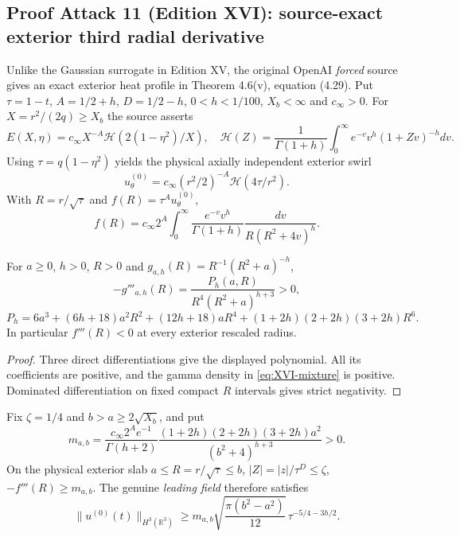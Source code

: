 \subsection*{Proof Attack 11 (Edition XVI): source-exact exterior third radial derivative}
\label{subsec:editionXVI-exterior-derivative}
Unlike the Gaussian surrogate in Edition XV, the original OpenAI
\emph{forced} source gives an exact exterior heat profile in
Theorem 4.6(v), equation (4.29). Put $\tau=1-t$,
$A=1/2+h$, $D=1/2-h$, $0<h<1/100$, $X_b<\infty$ and $c_\infty>0$.
For $X=r^2/(2q)\ge X_b$ the source asserts
\[
E(X,\eta)=c_\infty X^{-A}\mathcal H(2(1-\eta^2)/X),\quad
\mathcal H(Z)=\frac1{\Gamma(1+h)}
\int_0^\infty e^{-v}v^h(1+Zv)^{-h}dv.
\]
Using $\tau=q(1-\eta^2)$ yields the physical axially independent
exterior swirl
\[
u_\theta^{(0)}=c_\infty(r^2/2)^{-A}\mathcal H(4\tau/r^2).
\]
With $R=r/\sqrt\tau$ and $f(R)=\tau^Au_\theta^{(0)}$,
\begin{equation}\label{eq:XVI-mixture}
\boxed{ f(R)=c_\infty2^A\int_0^\infty
\frac{e^{-v}v^h}{\Gamma(1+h)}
\frac{dv}{R(R^2+4v)^h}. }
\end{equation}
\begin{proposition}
For $a\ge0$, $h>0$, $R>0$ and $g_{a,h}(R)=R^{-1}(R^2+a)^{-h}$,
\[
-g'''_{a,h}(R)=\frac{P_h(a,R)}{R^4(R^2+a)^{h+3}}>0,
\]
\[
P_h=6a^3+(6h+18)a^2R^2+(12h+18)aR^4+
(1+2h)(2+2h)(3+2h)R^6.
\]
In particular $f'''(R)<0$ at every exterior rescaled radius.
\end{proposition}
\begin{proof}
Three direct differentiations give the displayed polynomial.
All its coefficients are positive, and the gamma density in
\eqref{eq:XVI-mixture} is positive. Dominated differentiation
on fixed compact $R$ intervals gives strict negativity.
\end{proof}
\begin{proposition}
Fix $\zeta=1/4$ and $b>a\ge2\sqrt{X_b}$, and put
\[
m_{a,b}=
\frac{c_\infty2^Ae^{-1}}{\Gamma(h+2)}
\frac{(1+2h)(2+2h)(3+2h)a^2}{(b^2+4)^{h+3}}>0.
\]
On the physical exterior slab
$a\le R=r/\sqrt\tau\le b$,
$|Z|=|z|/\tau^D\le\zeta$,
$-f'''(R)\ge m_{a,b}$. The genuine \emph{leading field}
therefore satisfies
\begin{equation}\label{eq:XVI-source-H3-lower}
\boxed{\|u^{(0)}(t)\|_{H^3(\mathbb R^3)}
\ge m_{a,b}\sqrt{\frac{\pi(b^2-a^2)}{12}}\,
\tau^{-5/4-3h/2}.}
\end{equation}
\end{proposition}
